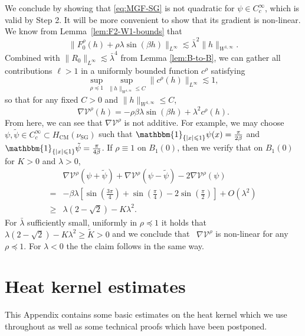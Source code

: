\documentclass[11pt, a4paper]{scrartcl}
\numberwithin{equation}{section}
\theoremstyle{plain}
\theoremstyle{remark}
\newcommand{\tmop}[1]{\ensuremath{\operatorname{#1}}}
\newcommand{\tmtextbf}[1]{\text{{\bfseries{#1}}}}
\begin{document}
\tmtextbf{Step 3.} We conclude by showing that \eqref{eq:MGF-SG} is not
quadratic for $\psi\in C^\infty_c$, which is valid by Step 2.
It will be more convenient to show that its
gradient is non-linear.
We know from Lemma~\ref{lem:F2-W1-bounds} that
\[
	\| F_0^{\rho} (h) + \rho\lambda\sin(\beta h)\|_{L^{\infty}}
	\lesssim \bar{\lambda}^2 \| h \|_{W^{1, \infty}}.
\]
Combined with $\|
	R_0 \|_{L^{\infty}} \lesssim \bar{\lambda}^4$ from Lemma \ref{lem:B-to-B}, we can
gather all contributions $\ell > 1$ in a uniformly bounded function $c^{\rho}$
satisfying
\[ \sup_{\rho \preceq  1} \sup_{\| h \|_{W^{1, \infty}} \leqslant C}
	\| c^{\rho} (h) \|_{L^{\infty}} \lesssim 1, \]
so that for any fixed $C > 0$ and $\| h \|_{W^{1, \infty}} \leqslant C$,
\[ \nabla \mathcal{V}^{\rho} (h) = - \rho \beta \lambda \sin (\beta h) +
	\lambda^2 c^{\rho} (h) . \]
From here, we can see that $\nabla \mathcal{V}^{\rho}$ is not additive. For
example, we may choose $\psi, \tilde{\psi} \in C^{\infty}_c \subset
	H_{\tmop{CM}} (\nu_{\tmop{SG}})$ such that $\mathbbm{1}_{\{ | x | \leqslant 1
		\}} \psi (x) = \frac{\pi}{2 \beta}$ and $\mathbbm{1}_{\{ | x | \leqslant 1 \}}
	\tilde{\psi} = \frac{\pi}{4 \beta}$. If $\rho \equiv 1$ on
$B_1 (0)$, then we verify that on $B_1 (0)$ for $K > 0$ and $\lambda>0$,
\begin{align}
	          & \nabla \mathcal{V}^{\rho} (\psi + \tilde{\psi}) + \nabla
	\mathcal{V}^{\rho} (\psi - \tilde{\psi}) - 2 \nabla \mathcal{V}^{\rho}
	(\psi)                                                                  \\
	=         & -\beta \lambda \left[ \sin \left( \frac{3 \pi}{4} \right) +
		\sin \left( \frac{\pi}{4} \right) - 2 \sin \left( \frac{\pi}{2} \right)
	\right] + O (\lambda^2)                                                 \\
	\geqslant & \lambda \left( 2 - \sqrt{2} \right) - K \lambda^2 .
\end{align}
For $\bar{\lambda}$ sufficiently small, uniformly in $\rho \preceq  1$ it holds
that $\lambda \left(2 - \sqrt{2} \right) - K \lambda^2 \geqslant \tilde{K} >
	0$ and we conclude that \ $\nabla \mathcal{V}^{\rho}$ is non-linear for any
$\rho \preceq  1$. For $\lambda<0$ the the claim follows in the same way.


\appendix\section{Heat kernel estimates}\label{app:hk}

This Appendix contains some basic estimates on the heat kernel which we use
throughout as well as some technical proofs which have been postponed.
\end{document}
